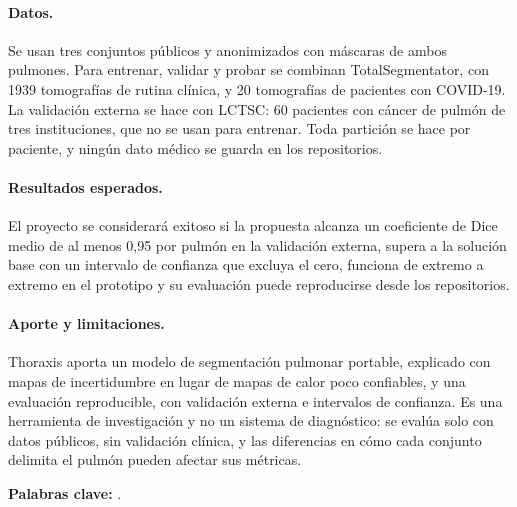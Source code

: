 \paragraph{Datos.}
Se usan tres conjuntos públicos y anonimizados con máscaras de ambos pulmones.
Para entrenar, validar y probar se combinan TotalSegmentator, con 1939
tomografías de rutina clínica, y 20 tomografías de pacientes con COVID-19. La
validación externa se hace con LCTSC: 60 pacientes con cáncer de pulmón de tres
instituciones, que no se usan para entrenar. Toda partición se hace
por paciente, y ningún dato médico se guarda en los repositorios.

\paragraph{Resultados esperados.}
El proyecto se considerará exitoso si la propuesta alcanza un coeficiente de
Dice medio de al menos 0,95 por pulmón en la validación externa, supera a la
solución base con un intervalo de confianza que excluya el cero, funciona de
extremo a extremo en el prototipo y su evaluación puede reproducirse desde los
repositorios.

\paragraph{Aporte y limitaciones.}
Thoraxis aporta un modelo de segmentación pulmonar portable, explicado con
mapas de incertidumbre en lugar de mapas de calor poco confiables, y una
evaluación reproducible, con validación externa e intervalos de confianza. Es
una
herramienta de investigación y no un sistema de diagnóstico: se evalúa solo con
datos públicos, sin validación clínica, y las diferencias en cómo cada conjunto
delimita el pulmón pueden afectar sus métricas.

\medskip
\noindent\textbf{Palabras clave:} \articleKeywords.

\label{summary:end}
\articleCheckOnePage
